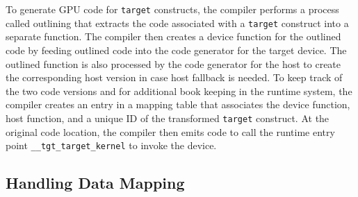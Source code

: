 \documentclass[acmtog,natbib=false]{acmart}
\newcommand{\code}[1]{\texttt{#1}\xspace}
\begin{document}

To generate GPU code for \code{target} constructs, the compiler performs a process called outlining that extracts the code associated with a \code{target} construct into a separate function.
The compiler then creates a device function for the outlined code by feeding outlined code into the code generator for the target device. 
The outlined function is also processed by the code generator for the host to create the corresponding host version in case host fallback is needed.
To keep track of the two code versions and for additional book keeping in the runtime system, the compiler creates an entry in a mapping table that associates the device function, host function, and a unique ID of the transformed \code{target} construct.
At the original code location, the compiler then emits code to call the runtime entry point \code{\_\_tgt\_target\_kernel} to invoke the device.




\subsection{Handling Data Mapping}
\label{sec:HandlingDataMapping}
\end{document}
